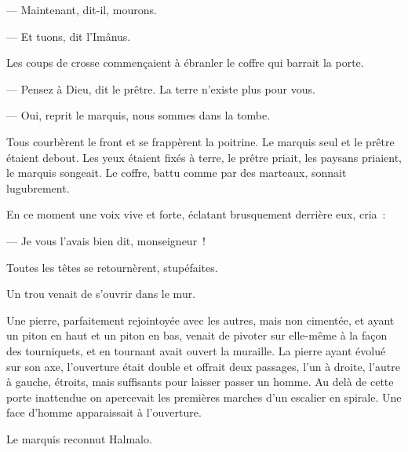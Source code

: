 \documentclass[french,twoside]{book} %
\begin{document}
— Maintenant, dit-il, mourons.\par
— Et tuons, dit l’Imânus.\par
 Les coups de crosse commençaient à ébranler le coffre qui barrait la porte.\par
— Pensez à Dieu, dit le prêtre. La terre n’existe plus pour vous.\par
— Oui, reprit le marquis, nous sommes dans la tombe.\par
Tous courbèrent le front et se frappèrent la poitrine. Le marquis seul et le prêtre étaient debout. Les yeux étaient fixés à terre, le prêtre priait, les paysans priaient, le marquis songeait. Le coffre, battu comme par des marteaux, sonnait lugubrement.\par
En ce moment une voix vive et forte, éclatant brusquement derrière eux, cria :\par
— Je vous l’avais bien dit, monseigneur !\par
Toutes les têtes se retournèrent, stupéfaites.\par
Un trou venait de s’ouvrir dans le mur.\par
Une pierre, parfaitement rejointoyée avec les autres, mais non cimentée, et ayant un piton en haut et un piton en bas, venait de pivoter sur elle-même à la façon des tourniquets, et en tournant avait ouvert la muraille. La pierre ayant évolué sur son axe, l’ouverture était double et offrait deux passages, l’un à droite, l’autre à gauche, étroits, mais suffisants pour laisser passer un homme. Au delà de cette porte inattendue on apercevait les premières marches d’un escalier en spirale. Une face d’homme apparaissait à l’ouverture.\par
Le marquis reconnut Halmalo.
\end{document}
